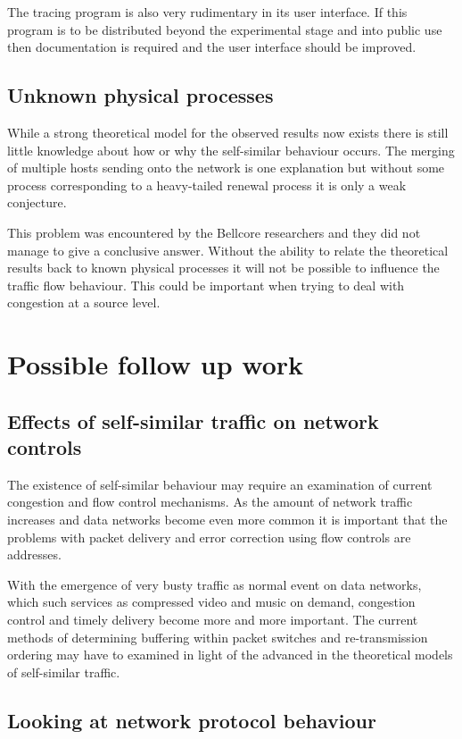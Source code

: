 The tracing program is also very rudimentary in its user interface.
If this program is to be distributed beyond the experimental stage and
into public use then documentation is required and the user interface
should be improved.

\subsection{Unknown physical processes}

While a strong theoretical model for the observed results now exists
there is still little knowledge about how or why the self-similar
behaviour occurs.  The merging of multiple hosts sending onto the
network is one explanation but without some process corresponding to
a heavy-tailed renewal process it is only a weak conjecture.

This problem was encountered by the Bellcore researchers and they did
not manage to give a conclusive answer.  Without the ability to relate
the theoretical results back to known physical processes it will not
be possible to influence the traffic flow behaviour.  This could be
important when trying to deal with congestion at a source level.

\section{Possible follow up work}

\subsection{Effects of self-similar traffic on network controls}

The existence of self-similar behaviour may require an examination of
current congestion and flow control mechanisms.  As the amount of
network traffic increases and data networks become even more common it
is important that the problems with packet delivery and error
correction using flow controls are addresses.

With the emergence of very busty traffic as normal event on data
networks, which such services as compressed video and music on demand,
congestion control and timely delivery become more and more important.
The current methods of determining buffering within packet switches
and re-transmission ordering may have to examined in light of the
advanced in the theoretical models of self-similar traffic.

\subsection{Looking at network protocol behaviour}

